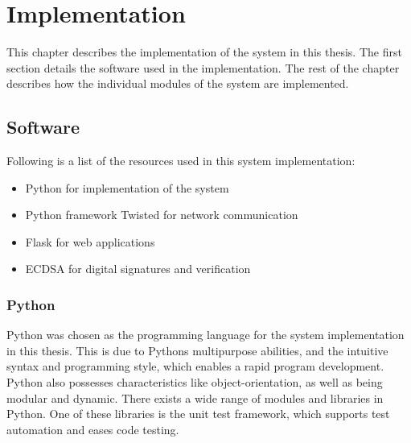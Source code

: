\chapter{Implementation}
This chapter describes the implementation of the system in this thesis. The first section details the software used in the implementation. The rest of the chapter describes how the individual modules of the system are implemented.


\section{Software}
Following is a list of the resources used in this system implementation:
\begin{itemize}
\item Python for implementation of the system
\item Python framework Twisted for network communication
\item Flask for web applications
\item ECDSA for digital signatures and verification
\end{itemize}

\subsection{Python}
Python \cite{python} was chosen as the programming language for the system implementation in this thesis. This is due to Pythons multipurpose abilities, and the intuitive syntax and programming style, which enables a rapid program development. Python also possesses characteristics like object-orientation, as well as being modular and dynamic. There exists a wide range of modules and libraries in Python. One of these libraries is the unit test framework, which supports test automation and eases code testing.

